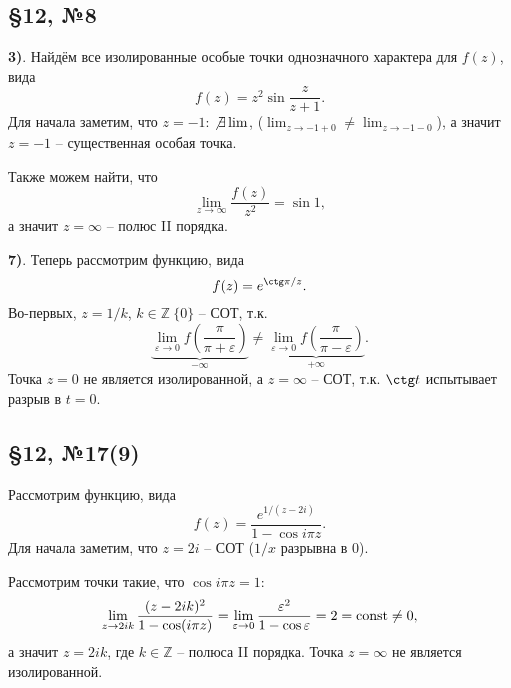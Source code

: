 \subsection*{\S12, №8}


\textbf{3)}. Найдём все изолированные особые точки однозначного характера для $f(z)$, вида
\begin{equation*}
    f(z) = z^2 \sin \frac{z}{z+1}.
\end{equation*}
Для начала заметим, что $z = -1$: $\not \exists \lim$, ($\lim_{z \to -1+0} \neq \lim_{z \to -1-0}$), а значит $z = -1$ -- существенная особая точка. 

Также можем найти, что
\begin{equation*}
    \lim_{z \to \infty} \frac{f(z)}{z^2} = \sin 1,
\end{equation*}
а значит $z = \infty$ -- полюс II порядка. 


\textbf{7)}. Теперь рассмотрим функцию, вида
\begin{equation*}
    f(z) = e^{\ctg \pi/z}. 
\end{equation*}
Во-первых, $z = 1/ k$, $k \in \mathbb{Z}\ \{0\}$ -- СОТ, т.к.
\begin{equation*}
    \underbrace{\lim_{\varepsilon \to 0} f\left(\frac{\pi}{\pi + \varepsilon}\right)}_{- \infty} \neq \underbrace{\lim_{\varepsilon \to 0} f\left(\frac{\pi}{\pi-\varepsilon}\right)}_{+ \infty}.
\end{equation*}
Точка $z = 0$ не является изолированной, а $z = \infty$ -- СОТ, т.к. $\ctg t$ испытывает разрыв в $t = 0$. 




\subsection*{\S12, №17(9)}

Рассмотрим функцию, вида
\begin{equation*}
    f(z) = \frac{e^{1/(z-2i)}}{1 - \cos i \pi z}.
\end{equation*}
Для начала заметим, что $z = 2 i$ -- СОТ ($1/x$ разрывна в 0). 

Рассмотрим точки такие, что $\cos i \pi z = 1$:
\begin{equation*}
    \lim_{z \to 2 i k} \frac{(z - 2 i k)^2}{1 - \cos (i \pi z)} = 
    \lim_{\varepsilon \to 0} \frac{\varepsilon^2}{1 - \cos \varepsilon} = 2 = \textnormal{const} \neq 0,
\end{equation*}
а значит $z = 2 i k$, где $k \in \mathbb{Z}$ -- полюса II порядка. Точка $z = \infty$ не является изолированной. 




